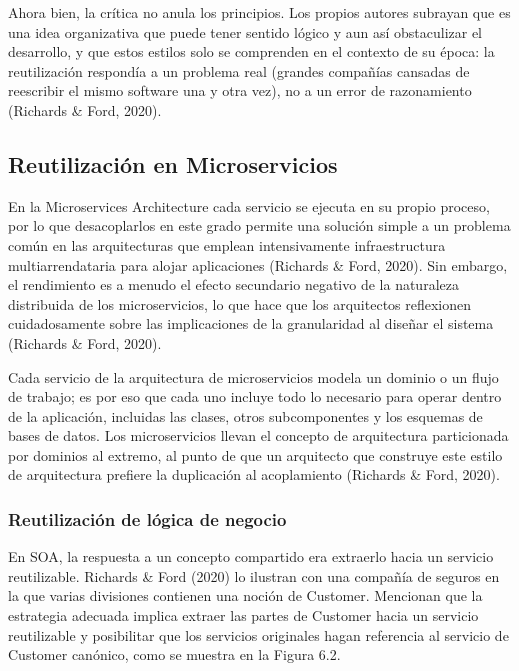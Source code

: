 \documentclass[12pt, a4paper]{article}
\begin{document}
    Ahora bien, la crítica no anula los principios. Los propios autores subrayan que es una idea organizativa que puede tener sentido lógico y aun así obstaculizar el desarrollo, y que estos estilos solo se comprenden en el contexto de su época: la reutilización respondía a un problema real (grandes compañías cansadas de reescribir el mismo software una y otra vez), no a un error de razonamiento (Richards \& Ford, 2020).

    \subsection{Reutilización en Microservicios}

    En la Microservices Architecture cada servicio se ejecuta en su propio proceso, por lo que desacoplarlos en este grado permite una solución simple a un problema común en las arquitecturas que emplean intensivamente infraestructura multiarrendataria para alojar aplicaciones (Richards \& Ford, 2020). Sin embargo, el rendimiento es a menudo el efecto secundario negativo de la naturaleza distribuida de los microservicios, lo que hace que los arquitectos reflexionen cuidadosamente sobre las implicaciones de la granularidad al diseñar el sistema (Richards \& Ford, 2020).

    Cada servicio de la arquitectura de microservicios modela un dominio o un flujo de trabajo; es por eso que cada uno incluye todo lo necesario para operar dentro de la aplicación, incluidas las clases, otros subcomponentes y los esquemas de bases de datos. Los microservicios llevan el concepto de arquitectura particionada por dominios al extremo, al punto de que un arquitecto que construye este estilo de arquitectura prefiere la duplicación al acoplamiento (Richards \& Ford, 2020).

    \subsubsection{Reutilización de lógica de negocio}

    En SOA, la respuesta a un concepto compartido era extraerlo hacia un servicio reutilizable. Richards \& Ford (2020) lo ilustran con una compañía de seguros en la que varias divisiones contienen una noción de Customer. Mencionan que la estrategia adecuada implica extraer las partes de Customer hacia un servicio reutilizable y posibilitar que los servicios originales hagan referencia al servicio de Customer canónico, como se muestra en la Figura 6.2.
\end{document}

